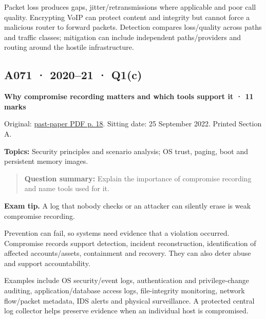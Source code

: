 \documentclass[11pt,a4paper]{article}
\begin{document}
Packet loss produces gaps,\allowbreak{} jitter/\allowbreak{}retransmissions where applicable and poor call quality. Encrypting VoIP can protect content and integrity but cannot force a malicious router to forward packets. Detection compares loss/\allowbreak{}quality across paths and traffic classes; mitigation can include independent paths/\allowbreak{}providers and routing around the hostile infrastructure.




\clearpage
\subsection{A071 · 2020–21 · Q1(c)}\label{a071}

\textbf{Why compromise recording matters and which tools support it · 11 marks}


Original: \href{../../CSE405-Security_Merged.pdf\#page=18}{past-paper PDF p. 18}. Sitting date: 25 September 2022. Printed Section A.


\textbf{Topics:} Security principles and scenario analysis; OS trust,\allowbreak{} paging,\allowbreak{} boot and persistent memory images.



\begin{quote}\small

\textbf{Question summary:} Explain the importance of compromise recording and name tools used for it.



\end{quote}


{\color{ForestGreen}\textbf{Exam tip.} A log that nobody checks or an attacker can silently erase is weak compromise recording.}


Prevention can fail,\allowbreak{} so systems need evidence that a violation occurred. Compromise records support detection,\allowbreak{} incident reconstruction,\allowbreak{} identification of affected accounts/\allowbreak{}assets,\allowbreak{} containment and recovery. They can also deter abuse and support accountability.


Examples include OS security/\allowbreak{}event logs,\allowbreak{} authentication and privilege-change auditing,\allowbreak{} application/\allowbreak{}database access logs,\allowbreak{} file-integrity monitoring,\allowbreak{} network flow/\allowbreak{}packet metadata,\allowbreak{} IDS alerts and physical surveillance. A protected central log collector helps preserve evidence when an individual host is compromised.
\end{document}

